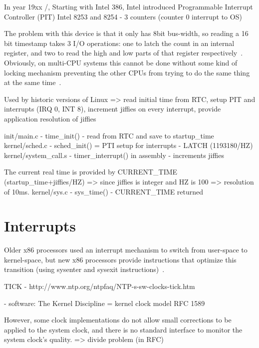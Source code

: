 In year 19xx /, Starting with Intel 386,
Intel introduced
Programmable Interrupt Controller (PIT) Intel 8253 and 8254 - 3 counters (counter 0 interrupt to OS)

The problem with this device is that it only has
8bit bus-width, so reading a 16 bit timestamp takes
3 I/O operations: one to latch the count in an internal register,
and two to read the high and low parts
of that register respectively~\cite{timecounters}.
Obviously, on multi-CPU systems this cannot be
done without some kind of locking mechanism
preventing the other CPUs from trying to do the
same thing at the same time~\cite{timecounters}.


Used by historic versions of Linux
=> read initial time from RTC, setup PIT and interrupts (IRQ 0, INT 8), increment jiffies on every interrupt, provide application resolution of jiffies

init/main.c - time\_init() - read from RTC and save to startup\_time
kernel/sched.c - sched\_init() = PTI setup for interrupts - LATCH (1193180/HZ)
kernel/system\_call.s - timer\_interrupt() in assembly - increments jiffies

The current real time is provided by CURRENT\_TIME (startup\_time+jiffies/HZ) => since jiffies is integer and HZ is 100 => resolution of 10ms.
kernel/sys.c - sys\_time() - CURRENT\_TIME returned


\section{Interrupts}
Older x86 processors used an interrupt mechanism to switch from
user-space to kernel-space, but new x86 processors provide instructions
that optimize this transition (using sysenter and sysexit instructions)~\cite{ibm-linux-system-calls}.


TICK - http://www.ntp.org/ntpfaq/NTP-s-sw-clocks-tick.htm


- software:
The Kernel Discipline =  kernel clock model RFC 1589

However, some clock implementations do not allow small corrections to be applied to the system clock, and there is no standard interface to monitor the system clock's quality.
=> divide problem (in RFC)
